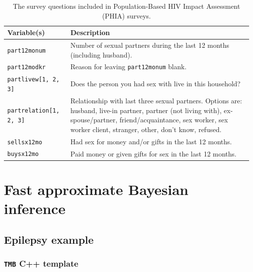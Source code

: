 \documentclass[a4paper, nobind]{templates/ociamthesis}
\begin{document}
\begin{table}[h]
\centering
\begin{tabularx}{\textwidth}{lX}
\toprule
Variable(s) & Description \\
\midrule
\texttt{part12monum} & Number of sexual partners during the last 12 months (including husband). \\
\texttt{part12modkr} & Reason for leaving \texttt{part12monum} blank. \\
\texttt{partlivew[1, 2, 3]} & Does the person you had sex with live in this household? \\
\texttt{partrelation[1, 2, 3]} & Relationship with last three sexual partners. Options are: husband, live-in partner, partner (not living with), ex-spouse/partner, friend/acquaintance, sex worker, sex worker client, stranger, other, don't know, refused. \\
\texttt{sellsx12mo} & Had sex for money and/or gifts in the last 12 months. \\
\texttt{buysx12mo} & Paid money or given gifts for sex in the last 12 months. \\
\bottomrule
\end{tabularx}
\caption{The survey questions included in Population-Based HIV Impact Assessment (PHIA) surveys.}
\end{table}

\hypertarget{fast-approximate-bayesian-inference}{%
\chapter{Fast approximate Bayesian inference}\label{fast-approximate-bayesian-inference}}

\hypertarget{epilepsy-example}{%
\section{Epilepsy example}\label{epilepsy-example}}

\hypertarget{tmb-epil}{%
\subsection{\texorpdfstring{\texttt{TMB} C++ template}{TMB C++ template}}\label{tmb-epil}}
\end{document}
